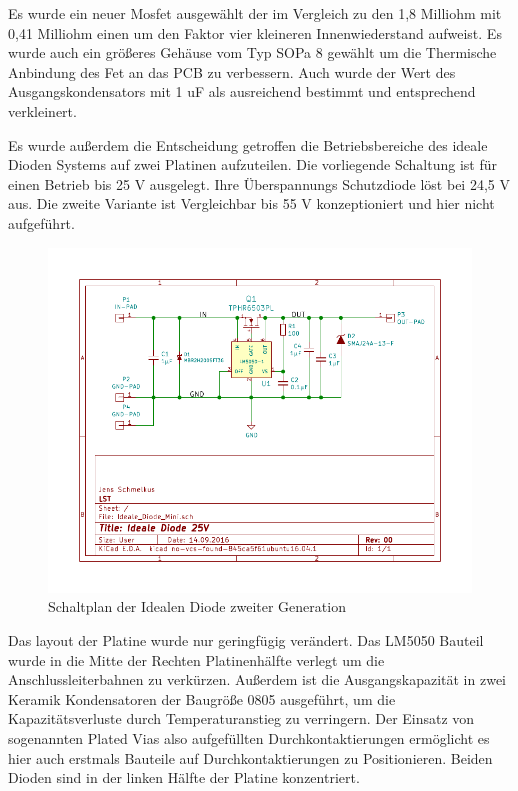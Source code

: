 Es wurde ein neuer Mosfet ausgewählt der im Vergleich zu den 1,8 Milliohm mit 0,41 Milliohm einen um den Faktor vier kleineren Innenwiederstand aufweist. Es wurde auch ein größeres Gehäuse vom Typ SOPa 8 gewählt um die Thermische Anbindung des Fet an das PCB zu verbessern.
Auch wurde der Wert des Ausgangskondensators mit 1 uF als ausreichend bestimmt und entsprechend verkleinert.

Es wurde außerdem die Entscheidung getroffen die Betriebsbereiche des ideale Dioden Systems auf zwei Platinen aufzuteilen. Die vorliegende Schaltung ist für einen Betrieb bis 25 V ausgelegt. Ihre Überspannungs Schutzdiode löst bei 24,5 V aus.
Die zweite Variante ist Vergleichbar bis 55 V konzeptioniert und hier nicht aufgeführt.


\begin{figure}[H]
\centering
\includegraphics[width=1.0\textwidth]{Schaltplaene/Ideale_Diode_25V_rev00-ver00.pdf} 
\caption{Schaltplan der Idealen Diode zweiter Generation} 
\label{fig:Schaltplan der Idealen Diode zweiter Generation}
\end{figure}

Das layout der Platine wurde nur geringfügig verändert. Das LM5050 Bauteil wurde in die Mitte der Rechten Platinenhälfte verlegt um die Anschlussleiterbahnen zu verkürzen. Außerdem ist die Ausgangskapazität in zwei Keramik Kondensatoren der Baugröße 0805 ausgeführt, um die Kapazitätsverluste durch Temperaturanstieg zu verringern.
Der Einsatz von sogenannten Plated Vias also aufgefüllten Durchkontaktierungen ermöglicht es hier auch erstmals Bauteile auf Durchkontaktierungen zu Positionieren.
Beiden Dioden sind in der linken Hälfte der Platine konzentriert.

